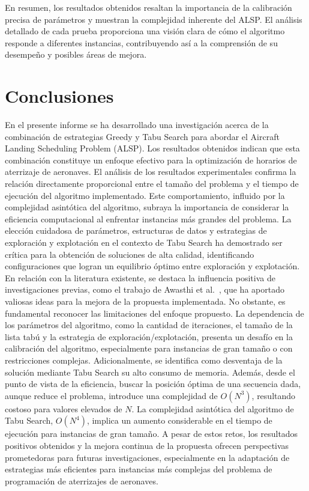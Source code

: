 \documentclass[letter, 10pt]{article}
\begin{document}
En resumen, los resultados obtenidos resaltan la importancia de la calibraci\'on precisa de par\'ametros y muestran la complejidad inherente del ALSP. El an\'alisis detallado de cada prueba proporciona una visi\'on clara de c\'omo el algoritmo responde a diferentes instancias, contribuyendo as\'i a la comprensi\'on de su desempe\~{n}o y posibles \'areas de mejora.


\section{Conclusiones}

En el presente informe se ha desarrollado una investigaci\'on acerca de la combinaci\'on de estrategias Greedy y Tabu Search para abordar el Aircraft Landing Scheduling Problem (ALSP). Los resultados obtenidos indican que esta combinaci\'on constituye un enfoque efectivo para la optimizaci\'on de horarios de aterrizaje de aeronaves. El an\'alisis de los resultados experimentales confirma la relaci\'on directamente proporcional entre el tama\~{n}o del problema y el tiempo de ejecuci\'on del algoritmo implementado. Este comportamiento, influido por la complejidad asint\'otica del algoritmo, subraya la importancia de considerar la eficiencia computacional al enfrentar instancias m\'as grandes del problema. La elecci\'on cuidadosa de par\'ametros, estructuras de datos y estrategias de exploraci\'on y explotaci\'on en el contexto de Tabu Search ha demostrado ser cr\'itica para la obtenci\'on de soluciones de alta calidad, identificando configuraciones que logran un equilibrio \'optimo entre exploraci\'on y explotaci\'on. En relaci\'on con la literatura existente, se destaca la influencia positiva de investigaciones previas, como el trabajo de Awasthi et al.~\cite{awasthi2013aircraft}, que ha aportado valiosas ideas para la mejora de la propuesta implementada. No obstante, es fundamental reconocer las limitaciones del enfoque propuesto. La dependencia de los par\'ametros del algoritmo, como la cantidad de iteraciones, el tama\~{n}o de la lista tab\'u y la estrategia de exploraci\'on/explotaci\'on, presenta un desaf\'io en la calibraci\'on del algoritmo, especialmente para instancias de gran tama\~{n}o o con restricciones complejas. Adicionalmente, se identifica como desventaja de la soluci\'on mediante Tabu Search su alto consumo de memoria. Adem\'as, desde el punto de vista de la eficiencia, buscar la posici\'on \'optima de una secuencia dada, aunque reduce el problema, introduce una complejidad de $O(N^3)$, resultando costoso para valores elevados de $N$. La complejidad asint\'otica del algoritmo de Tabu Search, $O(N^4)$, implica un aumento considerable en el tiempo de ejecuci\'on para instancias de gran tama\~{n}o. A pesar de estos retos, los resultados positivos obtenidos y la mejora continua de la propuesta ofrecen perspectivas prometedoras para futuras investigaciones, especialmente en la adaptaci\'on de estrategias m\'as eficientes para instancias m\'as complejas del problema de programaci\'on de aterrizajes de aeronaves.



\begin{comment}
Indicando toda la informaci\'on necesaria de acuerdo al tipo de documento revisado. Todas las referencias deben ser citadas en el documento.
\end{comment}



\end{document}
